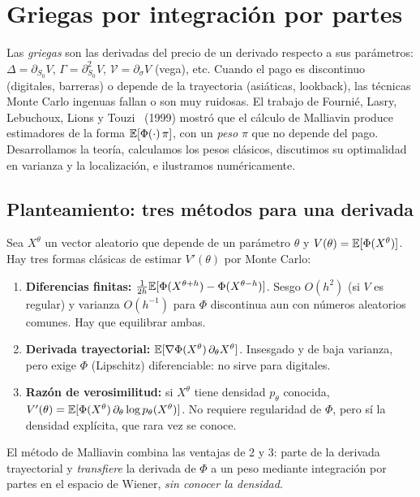 \chapter{Griegas por integración por partes}\label{cap:griegas}

\begin{panorama}
Las \emph{griegas} son las derivadas del precio de un derivado respecto a sus parámetros:
$\Delta=\partial_{S_0}V$, $\Gamma=\partial^2_{S_0}V$, $\mathcal V=\partial_\sigma V$ (vega), etc. Cuando el pago es discontinuo (digitales,
barreras) o depende de la trayectoria (asiáticas, lookback), las técnicas Monte Carlo
ingenuas fallan o son muy ruidosas. El trabajo de Fournié, Lasry, Lebuchoux, Lions y
Touzi~\cite{Fournie99} (1999) mostró que el cálculo de Malliavin produce estimadores de la forma
$\mathbb{E}[\Phi(\cdot)\,\pi]$, con un \emph{peso} $\pi$ que no depende del pago. Desarrollamos la teoría, calculamos
los pesos clásicos, discutimos su optimalidad en varianza y la localización, e ilustramos
numéricamente.
\end{panorama}

\section{Planteamiento: tres métodos para una derivada}
Sea $X^\theta$ un vector aleatorio que depende de un parámetro $\theta$ y $V(\theta)=\mathbb{E}[\Phi(X^\theta)]$. Hay tres formas
clásicas de estimar $V'(\theta)$ por Monte Carlo:
\begin{enumerate}
  \item \textbf{Diferencias finitas:} $\frac1{2h}\mathbb{E}[\Phi(X^{\theta+h})-\Phi(X^{\theta-h})]$. Sesgo $O(h^2)$ (si $V$ es regular) y varianza
  $O(h^{-1})$ para $\Phi$ discontinua aun con números aleatorios comunes. Hay que equilibrar
  ambas.
  \item \textbf{Derivada trayectorial:} $\mathbb{E}[\nabla\Phi(X^\theta)\,\partial_\theta X^\theta]$. Insesgado y de baja varianza, pero exige $\Phi$
  (Lipschitz) diferenciable: no sirve para digitales.
  \item \textbf{Razón de verosimilitud:} si $X^\theta$ tiene densidad $p_\theta$ conocida, $V'(\theta)=\mathbb{E}[\Phi(X^\theta)\,\partial_\theta\log p_\theta(X^\theta)]$.
  No requiere regularidad de $\Phi$, pero sí la densidad explícita, que rara vez se conoce.
\end{enumerate}
El método de Malliavin combina las ventajas de 2 y 3: parte de la derivada trayectorial y
\emph{transfiere} la derivada de $\Phi$ a un peso mediante integración por partes en el espacio de Wiener,
\emph{sin conocer la densidad}.

